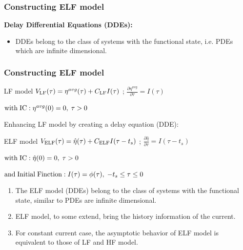 \documentclass[10pt,xcolor=dvipsnames,compress]{beamer}
\begin{document}
\begin{frame}
\frametitle{Constructing ELF model}
\vfill


\textbf{Delay Differential Equations (DDEs):}



\begin{itemize}
\item DDEs belong to the class of systems with the functional state, i.e. PDEs which are infinite dimensional. 

\end{itemize}



\vfill
\end{frame}



\begin{frame}
\frametitle{Constructing ELF model}
\vfill


\begin{block}{LF model}
$
V_{\rm LF}(\tau) = {\eta}^{avg}(\tau) + C_{\rm LF} I(\tau)
$
; \qquad
$
\frac{\partial{\eta}^{avg}}{\partial\tau} = I(\tau) 
$
\begin{center}
$
{\rm with \; IC:\;} {\eta}^{avg}(0)=0, \;  \tau>0
$
\end{center}
\end{block}

Enhancing LF model by creating a delay equation (DDE):


\begin{alertblock}{ELF model}
$
V_{\rm ELF}(\tau) = \hat{\eta}(\tau) + C_{\rm ELF} I(\tau - t_s)
$
; \qquad
$
\frac{\partial{\hat{\eta}}}{\partial\tau} = I(\tau- t_s) 
$
\begin{center}
$
{\rm with \; IC:\;} {\hat{\eta}}(0)=0, \;  \tau>0
$

$
{\rm and \; Initial \; Finction:\;} I(\tau)=\phi(\tau), \;  -t_s \leq \tau \leq 0
$
\end{center}
\end{alertblock}


\begin{enumerate}
\item The ELF model (DDEs) belong to the class of systems with the functional state, similar to PDEs are infinite dimensional. 

\item ELF model, to some extend, bring the history information of the current.

\item For constant current case, the asymptotic behavior of ELF model is equivalent to those of LF and HF model.

\end{enumerate}


\vfill
\end{frame}
\end{document}
